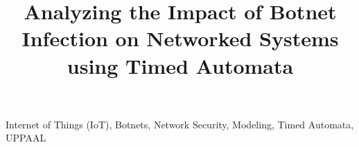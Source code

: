 \documentclass[conference]{IEEEtran}
\begin{document}





\title{Analyzing the Impact of Botnet Infection on Networked Systems using Timed Automata}


\author{
}



\maketitle



\begin{abstract}
\fontsize{10pt}{12pt}\selectfont
\label{abstract}

\end{abstract}


\begin{IEEEkeywords}
\fontsize{10pt}{12pt}\selectfont
Internet of Things (IoT), Botnets, Network Security, Modeling, Timed Automata, UPPAAL
\end{IEEEkeywords}
\end{document}
